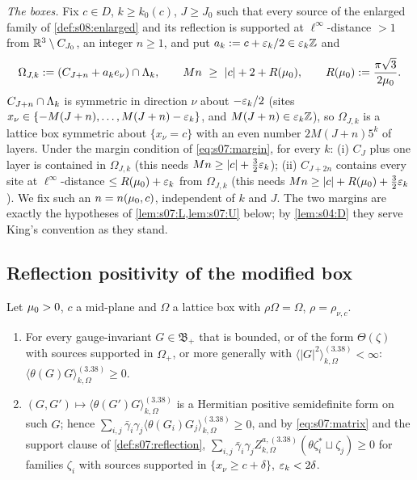 \emph{The boxes.} Fix $c\in D$, $k\ge k_0(c)$, $J\ge J_0$ such that every source of the enlarged family of \cref{def:s08:enlarged} and its reflection is supported at $\ell^\infty$-distance $>1$ from $\mathbb R^3\setminus C_{J_0}$, an integer $n\ge1$, and put $a_k:= c+\varepsilon_k/2\in\varepsilon_k\mathbb Z$ and
\begin{equation}\label{eq:s07:margin}
\Omega_{J,k}\defeq(C_{J+n}+a_ke_\nu)\cap\Lk,\qquad Mn\ \ge\ |c|+2+R(\lmu),\qquad R(\lmu)\defeq\frac{\pi\sqrt3}{2\lmu}.
\end{equation}
$C_{J+n}\cap\Lambda_k$ is symmetric in direction $\nu$ about $-\varepsilon_k/2$ (sites $x_\nu\in\{-M(J+n),\dots,M(J+n)-\varepsilon_k\}$, and $M(J+n)\in\varepsilon_k\mathbb Z$), so $\Omega_{J,k}$ is a lattice box symmetric about $\{x_\nu=c\}$ with an even number $2M(J+n)5^k$ of layers. Under the margin condition of \eqref{eq:s07:margin}, for every $k$: (i) $C_J$ plus one layer is contained in $\Omega_{J,k}$ (this needs $Mn\ge|c|+\frac32\varepsilon_k$); (ii) $C_{J+2n}$ contains every site at $\ell^\infty$-distance $\le R(\mu_0)+\varepsilon_k$ from $\Omega_{J,k}$ (this needs $Mn\ge|c|+R(\mu_0)+\frac32\varepsilon_k$). We fix such an $n=n(\mu_0,c)$, independent of $k$ and $J$. The two margins are exactly the hypotheses of \cref{lem:s07:L,lem:s07:U} below; by \cref{lem:s04:D} they serve King's convention as they stand.

\subsection{Reflection positivity of the modified box}

\begin{lemma}\label{lem:s07:RPbox}
Let $\mu_0>0$, $c$ a mid-plane and $\Omega$ a lattice box with $\rho\Omega=\Omega$, $\rho=\rho_{\nu,c}$.
\begin{enumerate}[label=\textup{(\alph*)},nosep]
\item For every gauge-invariant $G\in\mathfrak B_+$ that is bounded, or of the form $\Theta(\zeta)$ with sources supported in $\Omega_+$, or more generally with $\langle|G|^2\rangle^{(3.38)}_{k,\Omega}<\infty$: $\langle\theta(G)G\rangle^{(3.38)}_{k,\Omega}\ge0$.
\item $(G,G')\mapsto\langle\theta(G')G\rangle^{(3.38)}_{k,\Omega}$ is a Hermitian positive semidefinite form on such $G$; hence $\sum_{i,j}\bar\gamma_i\gamma_j\langle\theta(G_i)G_j\rangle^{(3.38)}_{k,\Omega}\ge0$, and by \eqref{eq:s07:matrix} and the support clause of \cref{def:s07:reflection}, $\sum_{i,j}\bar\gamma_i\gamma_jZ^{a,(3.38)}_{k,\Omega}(\theta\zeta_i^*\sqcup\zeta_j)\ge0$ for families $\zeta_i$ with sources supported in $\{x_\nu\ge c+\delta\}$, $\varepsilon_k<2\delta$.
\end{enumerate}
\end{lemma}

